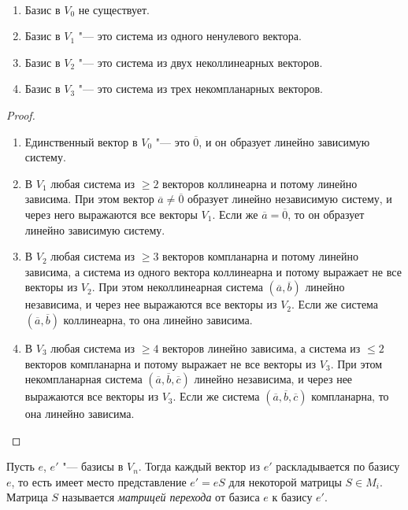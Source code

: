    \begin{theorem}~
    	\begin{enumerate}
    		\item Базис в $V_0$ не существует.
    		\item Базис в $V_1$ "--- это система из одного ненулевого вектора.
    		\item Базис в $V_2$ "--- это система из двух неколлинеарных векторов.
    		\item Базис в $V_3$ "--- это система из трех некомпланарных векторов.
    	\end{enumerate}
    \end{theorem}
    
    \begin{proof}~
    	\begin{enumerate}
    		\item Единственный вектор в $V_0$ "--- это $\overline{0}$, и он образует линейно зависимую систему.
    		\item В $V_1$ любая система из $\ge 2$ векторов коллинеарна и потому линейно зависима. При этом вектор $\overline{a} \ne \overline{0}$ образует линейно независимую систему, и через него выражаются все векторы $V_1$. Если же $\overline{a} = \overline{0}$, то он образует линейно зависимую систему.
    		\item В $V_2$ любая система из $\ge 3$ векторов компланарна и потому линейно зависима, а система из одного вектора коллинеарна и потому выражает не все векторы из $V_2$. При этом неколлинеарная система $(\overline{a}, \overline{b})$ линейно независима, и через нее выражаются все векторы из $V_2$. Если же система $(\overline{a}, \overline{b})$ коллинеарна, то она линейно зависима.
    		\item В $V_3$ любая система из $\ge 4$ векторов линейно зависима, а система из $\le 2$ векторов компланарна и потому выражает не все векторы из $V_3$. При этом некомпланарная система $(\overline{a}, \overline{b}, \overline{c})$ линейно независима, и через нее выражаются все векторы из $V_3$. Если же система $(\overline{a}, \overline{b}, \overline{c})$ компланарна, то она линейно зависима.\qedhere
    	\end{enumerate}
    \end{proof}
    
    \begin{definition}
    	Пусть $e$, $e'$ "--- базисы в $V_n$. Тогда каждый вектор из $e'$ раскладывается по базису $e$, то есть имеет место представление $e' = eS$ для некоторой матрицы $S \in M_{i}$. Матрица $S$ называется \textit{матрицей перехода} от базиса $e$ к базису $e'$.
    \end{definition}
    
